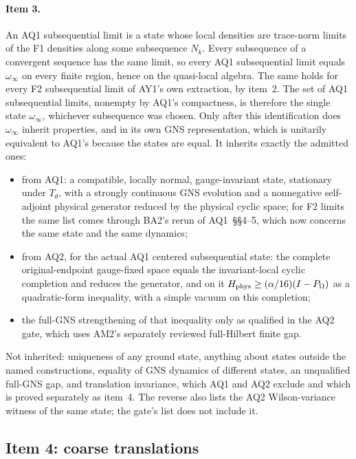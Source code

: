 \paragraph{Item 3.} An AQ1 subsequential limit is a state whose local
densities are trace-norm limits of the F1 densities along some subsequence
$N_k$. Every subsequence of a convergent sequence has the same limit, so
every AQ1 subsequential limit equals $\omega_\infty$ on every finite region,
hence on the quasi-local algebra. The same holds for every F2 subsequential
limit of AY1's own extraction, by item~2. The set of AQ1 subsequential limits,
nonempty by AQ1's compactness, is therefore the single state $\omega_\infty$,
whichever subsequence was chosen. Only after this identification does
$\omega_\infty$ inherit properties, and in its own GNS representation, which
is unitarily equivalent to AQ1's because the states are equal. It inherits
exactly the admitted ones:
\begin{itemize}
\item from AQ1: a compatible, locally normal, gauge-invariant state,
 stationary under $T_\theta$, with a strongly continuous GNS evolution and a
 nonnegative self-adjoint physical generator reduced by the physical cyclic
 space; for F2 limits the same list comes through BA2's rerun of AQ1~\S\S4--5,
 which now concerns the same state and the same dynamics;
\item from AQ2, for the actual AQ1 centered subsequential state: the complete
 original-endpoint gauge-fixed space equals the invariant-local cyclic
 completion and reduces the generator, and on it
 $H_{\rm phys}\ge(\alpha/16)(I-P_\Omega)$ as a quadratic-form inequality, with
 a simple vacuum on this completion;
\item the full-GNS strengthening of that inequality only as qualified in the
 AQ2 gate, which uses AM2's separately reviewed full-Hilbert finite gap.
\end{itemize}
Not inherited: uniqueness of any ground state, anything about states outside
the named constructions, equality of GNS dynamics of different states, an
unqualified full-GNS gap, and translation invariance, which AQ1 and AQ2
exclude and which is proved separately as item~4. The reverse also lists the
AQ2 Wilson-variance witness of the same state; the gate's list does not
include it.

\subsection{Item 4: coarse translations}
\label{sec:bb2-item4}
